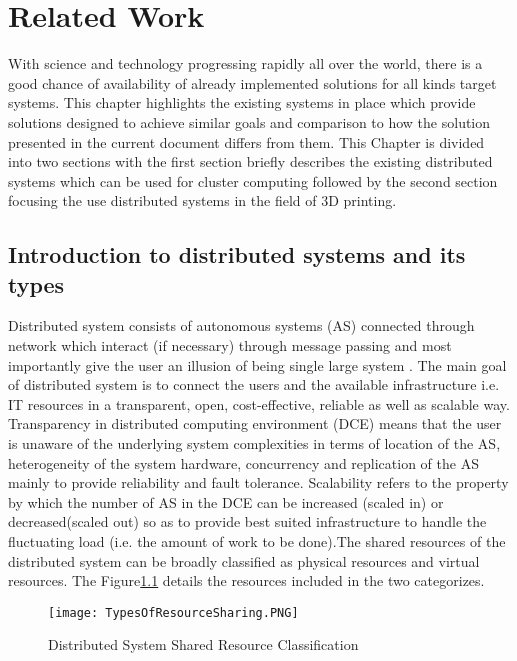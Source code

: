 \chapter{Related Work}

With science and technology progressing rapidly all over the world, there is a good chance of availability of already implemented solutions for all kinds target systems. This chapter highlights the existing systems in place which provide solutions designed to achieve similar goals and comparison to how the solution presented in the current document differs from them. This Chapter is divided into two sections with the first section briefly describes the existing distributed systems which can be used for cluster computing followed by the second section focusing the use distributed systems in the field of 3D printing.

\section{Introduction to distributed systems and its types}
Distributed system consists of autonomous systems (AS) connected through network which interact (if necessary) through message passing and most importantly give the user an illusion of being single large system \cite{DCE}. The main goal of distributed system is to connect the users and the available infrastructure i.e. IT resources in a transparent, open, cost-effective, reliable as well as scalable way. Transparency in distributed computing environment (DCE) means that the user is unaware of the underlying system complexities in terms of location of the AS, heterogeneity of the system hardware, concurrency and replication of the AS mainly to provide reliability and fault tolerance. Scalability refers to the property by which the number of AS in the DCE can be increased (scaled in) or decreased(scaled out) so as to provide best suited infrastructure to handle the fluctuating load (i.e. the amount of work to be done).The shared resources of the distributed system can be broadly classified as physical resources and virtual resources. The Figure\ref{fig:TypesOfResourceSharing} details the resources included in the two categorizes. 

\begin{figure}[ht!]
\centering
\texttt{[image: TypesOfResourceSharing.PNG]}
\caption{Distributed System Shared Resource Classification}
\label{fig:TypesOfResourceSharing}
\end{figure}
  
